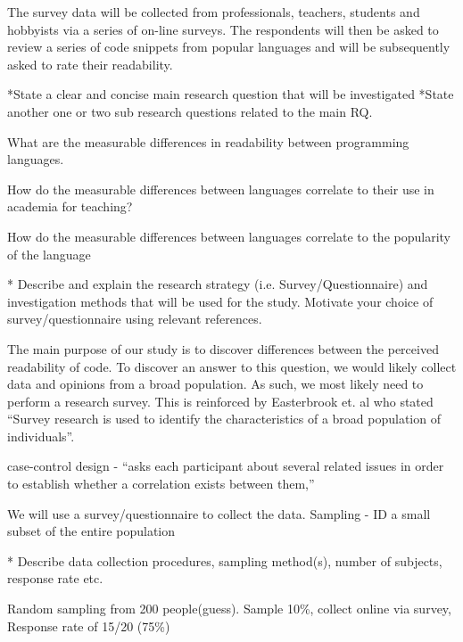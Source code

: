 \documentclass[times, 10pt,twocolumn]{IEEEtran}
\begin{document}
The survey data will be collected from professionals, teachers, students and hobbyists via a series of on-line surveys. The respondents will then be asked to review a series of code snippets from popular languages and will be subsequently asked to rate their readability. 
\newline

*State a clear and concise main  research  question  that  will  be  investigated
*State another one or  two sub research  questions related to  the main  RQ.

What are the measurable differences in readability between programming languages.

How do the measurable differences between languages correlate to their use in academia for teaching?

How do the measurable differences between languages correlate to the popularity of the language 

* Describe  and explain the research  strategy (i.e.  Survey/Questionnaire)
and investigation methods that  will  be  used  for the study.  Motivate  your  
choice  of  survey/questionnaire  using relevant  references.

The main purpose of our study is to discover differences between the perceived readability of code. To discover an answer to this question, we would likely collect data and opinions from a broad population. As such, we most likely need to perform a research survey. This is reinforced by Easterbrook et. al \cite{easterbrook2008selecting} who stated ``Survey research is used to identify the characteristics of a broad population of individuals''.





 case-control design - ``asks each participant about several related issues in 
order to establish whether a correlation exists between them,'' \cite{easterbrook2008selecting}

We will use a survey/questionnaire to collect the data.
Sampling - ID a small subset of the entire population

* Describe  data  collection  procedures, sampling  method(s),  number  of  
subjects, response  rate  etc.

Random sampling from 200 people(guess). Sample 10\%, collect online via survey, Response rate of 15/20 (75\%)
\end{document}
